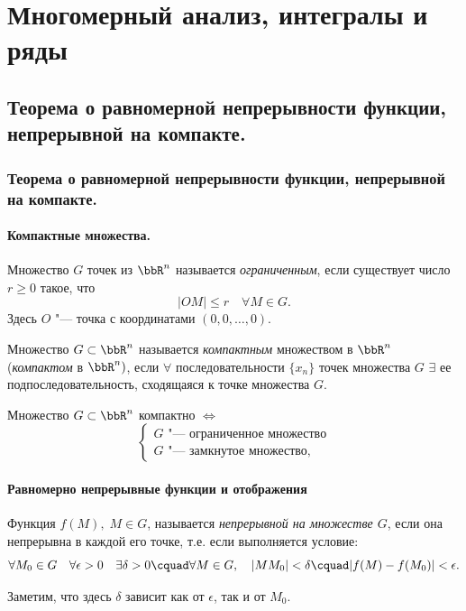\part{Многомерный анализ, интегралы и ряды}

\chapter{Теорема о равномерной непрерывности функции, непрерывной на компакте.}

\section{Теорема о равномерной непрерывности функции, непрерывной на компакте.}

\subsection{Компактные множества.}

\begin{defn}
Множество $G$ точек из $\bbR ^n$ называется \textit{ограниченным}, если существует число $r\ge 0$ такое, что
$$
|OM|\le r \quad \forall M\in G.
$$
Здесь $O$ "--- точка с координатами $(0,0,\dots,0)$.
\end{defn}

\begin{defn}
Множество $G \subset \bbR^n$ называется \textit{компактным} множеством в $\bbR^n$ (\textit{компактом} в $\bbR^n)$, если $\forall$ последовательности $\{ x_n \}$ точек множества $G$ $\exists$ ее подпоследовательность, сходящаяся к точке множества $G$.
\end{defn}

\begin{thm}
Множество $G \subset \bbR^n$ компактно $\Leftrightarrow$
\begin{equation}
\begin{cases}
G \textit{ "--- ограниченное множество} \\
G \textit{ "--- замкнутое множество},
\end{cases}
\end{equation}
\end{thm}


\subsection{Равномерно непрерывные функции и отображения}

\begin{defn}
Функция $f(M),\;M\in G$, называется \textit{непрерывной на множестве $G$}, если она непрерывна в каждой его точке, т.е. если выполняется условие:
\begin{equation}\label{yaa45e1}
\forall M_0\in G\quad \forall\epsilon>0 \quad \exists\delta>0\cquad\forall M\in G,\quad |MM_0|<\delta\cquad|f(M)-f(M_0)|<\epsilon.
\end{equation}
\end{defn}
Заметим, что здесь $\delta$ зависит как от $\epsilon$, так и от $M_0$.

